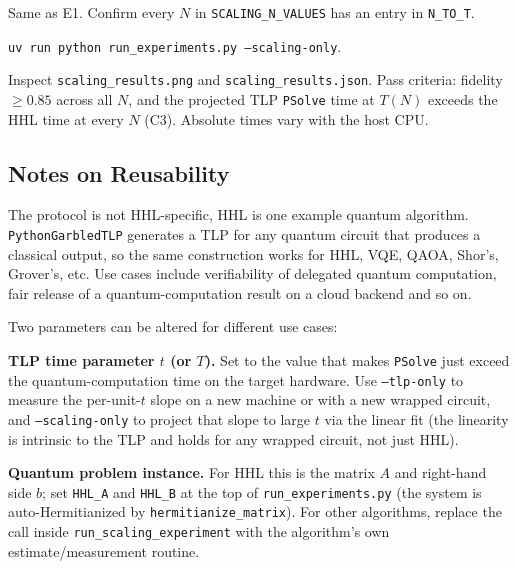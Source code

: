 \documentclass[nonacm,sigconf]{acmart}
\begin{document}
\begin{compactitem}
  \begin{asparadesc}
  \item[Preparation:] Same as E1.  Confirm every $N$ in
    \texttt{SCALING\_N\_VALUES} has an entry in
    \texttt{N\_TO\_T}.

  \item[Execution:]
    \texttt{uv run python run\_experiments.py --scaling-only}.

  \item[Results:] Inspect
    \texttt{scaling\_results.png} and
    \texttt{scaling\_results.json}.  Pass criteria: fidelity $\geq 0.85$ across all $N$, and the projected TLP
    \texttt{PSolve} time at $T(N)$ exceeds the HHL time at every
    $N$ (C3).  Absolute times vary with the host CPU.
  \end{asparadesc}
\end{compactitem}

\subsection{Notes on Reusability}

The protocol is not HHL-specific, HHL is one example quantum
algorithm.  \texttt{PythonGarbledTLP} generates a TLP for any
quantum circuit that produces a classical output, so the same
construction works for HHL, VQE, QAOA, Shor's, Grover's, etc. Use cases include verifiability of delegated
quantum computation, fair release of a quantum-computation result
on a cloud backend and so on.

Two parameters can be altered for different use cases:

\begin{compactitem}
\item \textbf{TLP time parameter $t$ (or $T$).}  Set to the value
  that makes \texttt{PSolve} just exceed the
  quantum-computation time on the target hardware.  Use
  \texttt{--tlp-only} to measure the per-unit-$t$ slope on a new
  machine or with a new wrapped circuit, and
  \texttt{--scaling-only} to project that slope to large $t$ via
  the linear fit (the linearity is intrinsic to the TLP and
  holds for any wrapped circuit, not just HHL).
\item \textbf{Quantum problem instance.}  For HHL this is the
  matrix $A$ and right-hand side $b$; set \texttt{HHL\_A} and
  \texttt{HHL\_B} at the top of \texttt{run\_experiments.py}
  (the system is auto-Hermitianized by
  \texttt{hermitianize\_matrix}).  For other algorithms,
  replace the call inside \texttt{run\_scaling\_experiment}
  with the algorithm's own estimate/measurement routine.
\end{compactitem}
\end{document}
